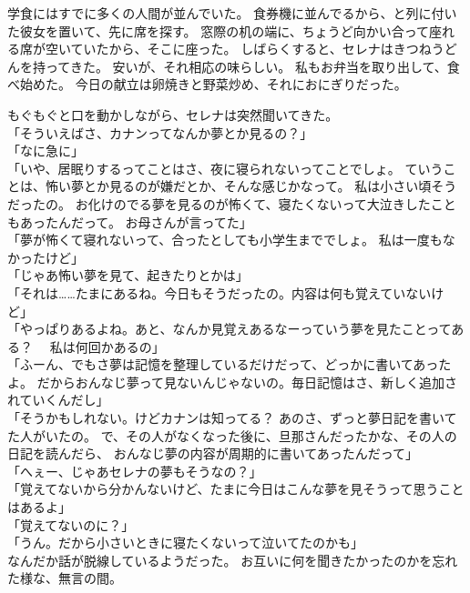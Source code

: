 \documentclass[../IHMain]{subfiles}
\begin{document}
学食にはすでに多くの人間が並んでいた。
食券機に並んでるから、と列に付いた彼女を置いて、先に席を探す。
窓際の机の端に、ちょうど向かい合って座れる席が空いていたから、そこに座った。
しばらくすると、セレナはきつねうどんを持ってきた。
安いが、それ相応の味らしい。
私もお弁当を取り出して、食べ始めた。
今日の献立は卵焼きと野菜炒め、それにおにぎりだった。

もぐもぐと口を動かしながら、セレナは突然聞いてきた。\\
「そういえばさ、カナンってなんか夢とか見るの？」\\
「なに急に」\\
「いや、居眠りするってことはさ、夜に寝られないってことでしょ。
ていうことは、怖い夢とか見るのが嫌だとか、そんな感じかなって。
私は小さい頃そうだったの。
お化けのでる夢を見るのが怖くて、寝たくないって大泣きしたこともあったんだって。
お母さんが言ってた」\\
「夢が怖くて寝れないって、合ったとしても小学生まででしょ。
私は一度もなかったけど」\\
「じゃあ怖い夢を見て、起きたりとかは」\\
「それは……たまにあるね。今日もそうだったの。内容は何も覚えていないけど」\\
「やっぱりあるよね。あと、なんか見覚えあるなーっていう夢を見たことってある？　
私は何回かあるの」\\
「ふーん、でもさ夢は記憶を整理しているだけだって、どっかに書いてあったよ。
だからおんなじ夢って見ないんじゃないの。毎日記憶はさ、新しく追加されていくんだし」\\
「そうかもしれない。けどカナンは知ってる？
あのさ、ずっと夢日記を書いてた人がいたの。
で、その人がなくなった後に、旦那さんだったかな、その人の日記を読んだら、
おんなじ夢の内容が周期的に書いてあったんだって」\\
「へぇー、じゃあセレナの夢もそうなの？」\\
「覚えてないから分かんないけど、たまに今日はこんな夢を見そうって思うことはあるよ」\\
「覚えてないのに？」\\
「うん。だから小さいときに寝たくないって泣いてたのかも」\\
なんだか話が脱線しているようだった。
お互いに何を聞きたかったのかを忘れた様な、無言の間。
\end{document}
